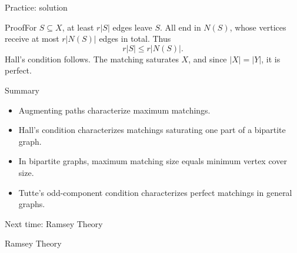 \documentclass[aspectratio=169,11pt]{beamer}
\renewcommand{\Proof}[1]{\begin{block}{Proof}\normalsize #1\end{block}}
\begin{document}
\begin{frame}{Practice: solution}
\large
\Proof{For $S\subseteq X$, at least $r|S|$ edges leave $S$. All end in $N(S)$, whose vertices receive at most $r|N(S)|$ edges in total. Thus
\[r|S|\leq r|N(S)|.\]
Hall's condition follows. The matching saturates $X$, and since $|X|=|Y|$, it is perfect.}
\end{frame}
\begin{frame}{Summary}
\large
\begin{itemize}
\item Augmenting paths characterize maximum matchings.
\item Hall's condition characterizes matchings saturating one part of a bipartite graph.
\item In bipartite graphs, maximum matching size equals minimum vertex cover size.
\item Tutte's odd-component condition characterizes perfect matchings in general graphs.
\end{itemize}
\end{frame}
\begin{frame}{Next time: Ramsey Theory}\begin{center}{\Huge Ramsey Theory}\end{center}\end{frame}
\end{document}
